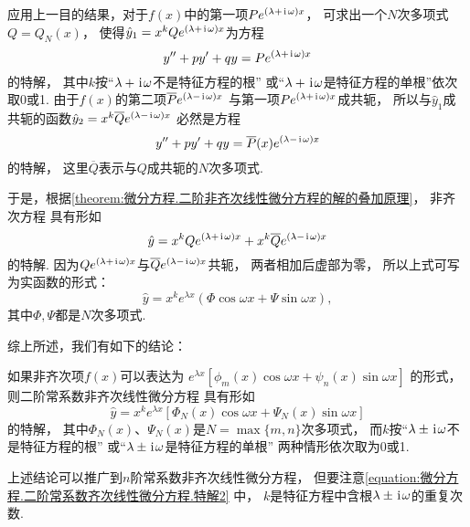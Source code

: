 应用上一目的结果，对于\(f(x)\)中的第一项\(P e^{(\lambda+\kern1pt\mathrm{i}\kern1pt\omega)x}\)，
可求出一个\(N\)次多项式\(Q = Q_N(x)\)，
使得\(\hat{y}_1 = x^k Q e^{(\lambda+\kern1pt\mathrm{i}\kern1pt\omega)x}\)为方程\[
	y'' + p y' + q y = P e^{(\lambda+\kern1pt\mathrm{i}\kern1pt\omega)x}
\]的特解，
其中\(k\)按“\(\lambda+\kern1pt\mathrm{i}\kern1pt\omega\)不是特征方程的根”
或“\(\lambda+\kern1pt\mathrm{i}\kern1pt\omega\)是特征方程的单根”依次取0或1.
由于\(f(x)\)的第二项\(\overline{P} e^{(\lambda-\kern1pt\mathrm{i}\kern1pt\omega)x}\)
与第一项\(P e^{(\lambda+\kern1pt\mathrm{i}\kern1pt\omega)x}\)成共轭，
所以与\(\hat{y}_1\)成共轭的函数\(\hat{y}_2 = x^k \overline{Q} e^{(\lambda-\kern1pt\mathrm{i}\kern1pt\omega)x}\)
必然是方程\[
	y'' + p y' + q y = \overline{P}(x) e^{(\lambda-\kern1pt\mathrm{i}\kern1pt\omega)x}
\]的特解，
这里\(\overline{Q}\)表示与\(Q\)成共轭的\(N\)次多项式.

于是，根据\cref{theorem:微分方程.二阶非齐次线性微分方程的解的叠加原理}，
非齐次方程  具有形如\[
\hat{y} = x^k Q e^{(\lambda+\kern1pt\mathrm{i}\kern1pt\omega)x} + x^k \overline{Q} e^{(\lambda-\kern1pt\mathrm{i}\kern1pt\omega)x}
\]的特解.
因为\(Q e^{(\lambda+\kern1pt\mathrm{i}\kern1pt\omega)x}\)与\(\overline{Q} e^{(\lambda-\kern1pt\mathrm{i}\kern1pt\omega)x}\)共轭，
两者相加后虚部为零，
所以上式可写为实函数的形式：
\begin{equation}
\hat{y} = x^k e^{\lambda x} (\Phi \cos\omega x + \Psi \sin\omega x),
\end{equation}
其中\(\Phi,\Psi\)都是\(N\)次多项式.

综上所述，我们有如下的结论：

如果非齐次项\(f(x)\)可以表达为
\(e^{\lambda x} [\phi_m(x) \cos\omega x + \psi_n(x) \sin\omega x]\)
的形式，
则二阶常系数非齐次线性微分方程
具有形如
\begin{equation}\label{equation:微分方程.二阶常系数齐次线性微分方程.特解2}
\hat{y} = x^k e^{\lambda x} [\Phi_N(x) \cos\omega x + \Psi_N(x) \sin\omega x]
\end{equation}
的特解，
其中\(\Phi_N(x)\)、\(\Psi_N(x)\)是\(N=\max\{m,n\}\)次多项式，
而\(k\)按“\(\lambda\pm\kern1pt\mathrm{i}\kern1pt\omega\)不是特征方程的根”%
或“\(\lambda\pm\kern1pt\mathrm{i}\kern1pt\omega\)是特征方程的单根”%
两种情形依次取为0或1.

上述结论可以推广到\(n\)阶常系数非齐次线性微分方程，
但要注意\cref{equation:微分方程.二阶常系数齐次线性微分方程.特解2} 中，
\(k\)是特征方程中含根\(\lambda\pm\kern1pt\mathrm{i}\kern1pt\omega\)的重复次数.

